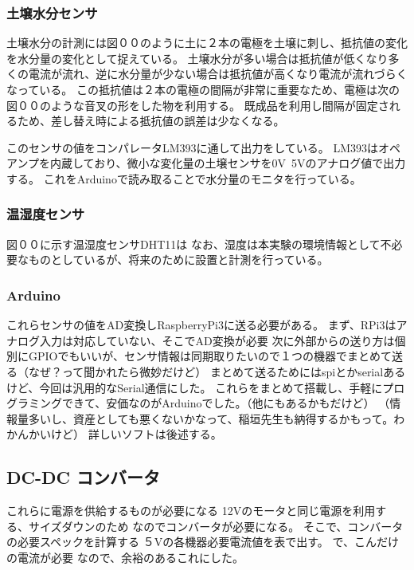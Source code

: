 \subsubsection{土壌水分センサ}
土壌水分の計測には図００のように土に２本の電極を土壌に刺し、抵抗値の変化を水分量の変化として捉えている。
土壌水分が多い場合は抵抗値が低くなり多くの電流が流れ、逆に水分量が少ない場合は抵抗値が高くなり電流が流れづらくなっている。
この抵抗値は２本の電極の間隔が非常に重要なため、電極は次の図００のような音叉の形をした物を利用する。
既成品を利用し間隔が固定されるため、差し替え時による抵抗値の誤差は少なくなる。
\par このセンサの値をコンパレータLM393に通して出力をしている。
LM393はオペアンプを内蔵しており、微小な変化量の土壌センサを0V~5Vのアナログ値で出力する。
これをArduinoで読み取ることで水分量のモニタを行っている。

\subsubsection{温湿度センサ}
図００に示す温湿度センサDHT11は
なお、湿度は本実験の環境情報として不必要なものとしているが、将来のために設置と計測を行っている。
\subsubsection{Arduino}
これらセンサの値をAD変換しRaspberryPi3に送る必要がある。
まず、RPi3はアナログ入力は対応していない、そこでAD変換が必要
次に外部からの送り方は個別にGPIOでもいいが、センサ情報は同期取りたいので１つの機器でまとめて送る（なぜ？って聞かれたら微妙だけど）
まとめて送るためにはspiとかserialあるけど、今回は汎用的なSerial通信にした。
これらをまとめて搭載し、手軽にプログラミングできて、安価なのがArduinoでした。（他にもあるかもだけど）
（情報量多いし、資産としても悪くないかなって、稲垣先生も納得するかもって。わかんかいけど）
詳しいソフトは後述する。
\subsection{DC-DC コンバータ}
これらに電源を供給するものが必要になる
12Vのモータと同じ電源を利用する、サイズダウンのため
なのでコンバータが必要になる。
そこで、コンバータの必要スペックを計算する
５Vの各機器必要電流値を表で出す。
で、こんだけの電流が必要
なので、余裕のあるこれにした。
